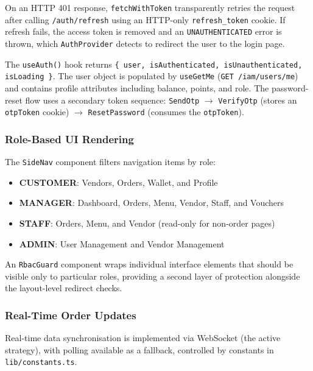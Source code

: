 \vspace{0.25cm}
\noindent
On an HTTP 401 response, \texttt{fetchWithToken} transparently retries the request after calling \texttt{/auth/refresh} using an HTTP-only \texttt{refresh\_token} cookie.
If refresh fails, the access token is removed and an \texttt{UNAUTHENTICATED} error is thrown, which \texttt{AuthProvider} detects to redirect the user to the login page.

\vspace{0.25cm}
\noindent
The \texttt{useAuth()} hook returns \texttt{\{ user, isAuthenticated, isUnauthenticated, isLoading \}}.
The user object is populated by \texttt{useGetMe} (\texttt{GET /iam/users/me}) and contains profile attributes including balance, points, and role.
The password-reset flow uses a secondary token sequence: \texttt{SendOtp} $\rightarrow$ \texttt{VerifyOtp} (stores an \texttt{otpToken} cookie) $\rightarrow$ \texttt{ResetPassword} (consumes the \texttt{otpToken}).

\subsubsection{Role-Based UI Rendering}
The \texttt{SideNav} component filters navigation items by role:
\begin{itemize}
    \item \textbf{CUSTOMER}: Vendors, Orders, Wallet, and Profile
    \item \textbf{MANAGER}: Dashboard, Orders, Menu, Vendor, Staff, and Vouchers
    \item \textbf{STAFF}: Orders, Menu, and Vendor (read-only for non-order pages)
    \item \textbf{ADMIN}: User Management and Vendor Management
\end{itemize}

\noindent
An \texttt{RbacGuard} component wraps individual interface elements that should be visible only to particular roles, providing a second layer of protection alongside the layout-level redirect checks.

\subsubsection{Real-Time Order Updates}
Real-time data synchronisation is implemented via WebSocket (the active strategy), with polling available as a fallback, controlled by constants in \texttt{lib/constants.ts}.

